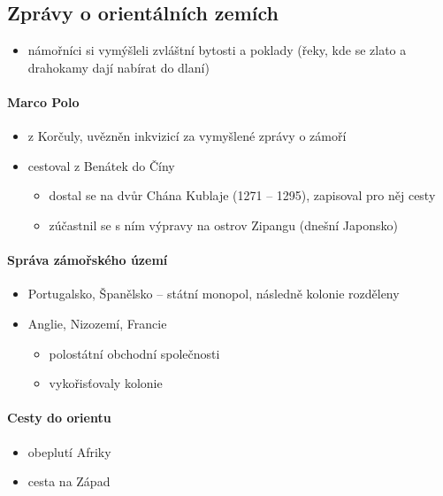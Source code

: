 \subsection{Zprávy o orientálních zemích}
\begin{itemize}
\item námořníci si vymýšleli zvláštní bytosti a poklady (řeky, kde se zlato a drahokamy dají nabírat do dlaní)
\end{itemize}

\paragraph{Marco Polo}
\begin{itemize}
\item z Korčuly, uvězněn inkvizicí za vymyšlené zprávy o zámoří
\item cestoval z Benátek do Číny
	\begin{itemize}
	\item dostal se na dvůr Chána Kublaje (1271 -- 1295), zapisoval pro něj cesty
	\item zúčastnil se s ním výpravy na ostrov Zipangu (dnešní Japonsko)
	\end{itemize}
\end{itemize}

\paragraph{Správa zámořského území}
\begin{itemize}
\item Portugalsko, Španělsko -- státní monopol, následně kolonie rozděleny
\item Anglie, Nizozemí, Francie
	\begin{itemize}
	\item polostátní obchodní společnosti
	\item vykořisťovaly kolonie	
	\end{itemize}
\end{itemize}

\paragraph{Cesty do orientu}
\begin{itemize}
\item obeplutí Afriky
\item cesta na Západ
\end{itemize}

